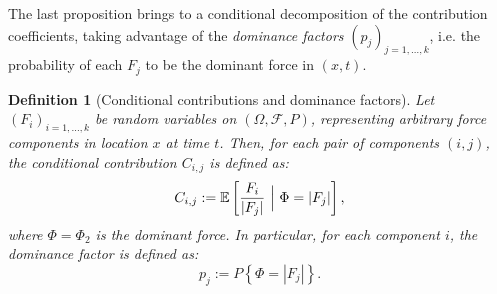 \documentclass{article}
\newtheorem{definition}[theorem]{Definition}
\begin{document}
The last proposition brings to a conditional decomposition of the contribution coefficients, taking advantage of the \emph{dominance factors} $(p_j)_{j=1,\dots, k}$, i.e. the probability of each $F_j$ to be the dominant force in $(x,t)$.

\begin{definition}[Conditional contributions and dominance factors]
Let $(F_i)_{i=1,\dots, k}$ be random variables on $(\Omega, \mathcal F, P)$, representing arbitrary force components in location $x$ at time $t$. Then, for each pair of components $(i,j)$, the conditional contribution $C_{i,j}$ is defined as:
$$C_{i,j}:=\mathbb E\left[\frac{F_i}{|F_j|}\ \Big{|}\ \Phi=|F_j|\right],$$
where $\Phi=\Phi_2$ is the dominant force. In particular, for each component $i$, the dominance factor is defined as:
$$p_j:=P\left\{\Phi=|F_j|\right\}.$$
\end{definition}

\newpage


\end{document}

